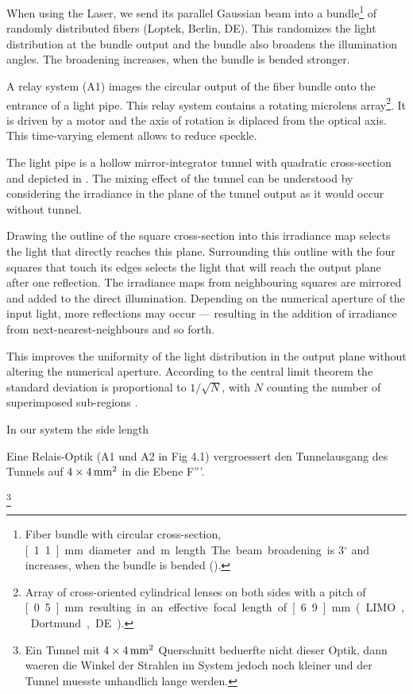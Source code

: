 When using the Laser, we send its parallel Gaussian beam into a
bundle\footnote{Fiber bundle with circular cross-section,
  \unit[1.1]{mm} diameter and \unit[2]{m} length. The beam broadening
  is $3{}^\circ$ and increases, when the bundle is bended
  (\cite{D8.4}).} of randomly distributed fibers (Loptek, Berlin,
DE). This randomizes the light distribution at the bundle output and
the bundle also broadens the illumination angles. The broadening
increases, when the bundle is bended stronger.

A relay system (A1) images the circular output of the fiber bundle
onto the entrance of a light pipe. This relay system contains a
rotating microlens array\footnote{Array of cross-oriented cylindrical
  lenses on both sides with a pitch of \unit[0.5]{mm} resulting in an
  effective focal length of \unit[6.9]{mm} (LIMO, Dortmund, DE).}. It
is driven by a motor and the axis of rotation is diplaced from the
optical axis. This time-varying element allows to reduce speckle. 

The light  pipe is  a hollow  mirror-integrator tunnel  with quadratic
cross-section and depicted  in . The mixing
effect of the  tunnel can be understood by  considering the irradiance
in the plane of the tunnel output as it would occur without tunnel.

Drawing the outline of the square cross-section into this irradiance
map selects the light that directly reaches this plane.  Surrounding
this outline with the four squares that touch its edges selects the
light that will reach the output plane after one reflection. The
irradiance maps from neighbouring squares are mirrored and added to
the direct illumination. Depending on the numerical aperture of the
input light, more reflections may occur --- resulting in the addition
of irradiance from next-nearest-neighbours and so forth.

This improves the uniformity of the light distribution in the output
plane without altering the numerical aperture.  According to the
central limit theorem the standard deviation is proportional to
$1/\sqrt{N}$, with $N$ counting the number of superimposed sub-regions
\citep{Koshel2012}.

In our system the side length 


Eine Relais-Optik (A1
   und A2 in Fig 4.1) vergroessert
   den Tunnelausgang des Tunnels auf $\unit[4\times4]{mm^2}$
   in die Ebene F'''.

\footnote{Ein Tunnel mit $\unit[4\times4]{mm^2}$
   Querschnitt beduerfte nicht dieser Optik, dann waeren die Winkel
   der Strahlen im System jedoch noch kleiner und der Tunnel muesste
   unhandlich lange werden.} 

